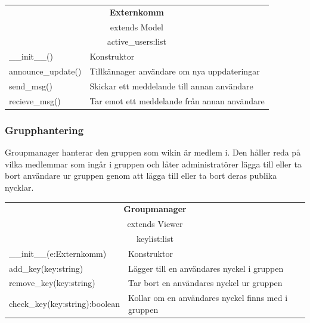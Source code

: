 \begin{tabular}{|l|p{10 cm}|}
\hline
\multicolumn{2}{|c|}{\textbf{Externkomm}} \\
\multicolumn{2}{|c|}{extends Model} \\
\hline
\multicolumn{2}{|c|}{active\_users:list} \\
\hline
\_\_init\_\_() & Konstruktor\\
announce\_update()& Tillkännager användare om nya uppdateringar\\
send\_msg() & Skickar ett meddelande till annan användare\\
recieve\_msg() & Tar emot ett meddelande från annan användare\\
\hline

\end{tabular}

\subsubsection{Grupphantering}
Groupmanager hanterar den gruppen som wikin är medlem i. Den håller reda på vilka medlemmar som ingår i gruppen och låter administratörer lägga till eller ta bort användare ur gruppen genom att lägga till eller ta bort deras publika nycklar.

\begin{tabular}{|l|p{10 cm}|}
\hline
\multicolumn{2}{|c|}{\textbf{Groupmanager}} \\
\multicolumn{2}{|c|}{extends Viewer} \\
\hline
\multicolumn{2}{|c|}{keylist:list} \\
\hline
\_\_init\_\_(e:Externkomm) & Konstruktor\\
add\_key(key:string)& Lägger till en användares nyckel i gruppen\\
remove\_key(key:string)& Tar bort en användares nyckel ur gruppen\\
check\_key(key:string):boolean& Kollar om en användares nyckel finns med i gruppen\\
\hline

\end{tabular}

